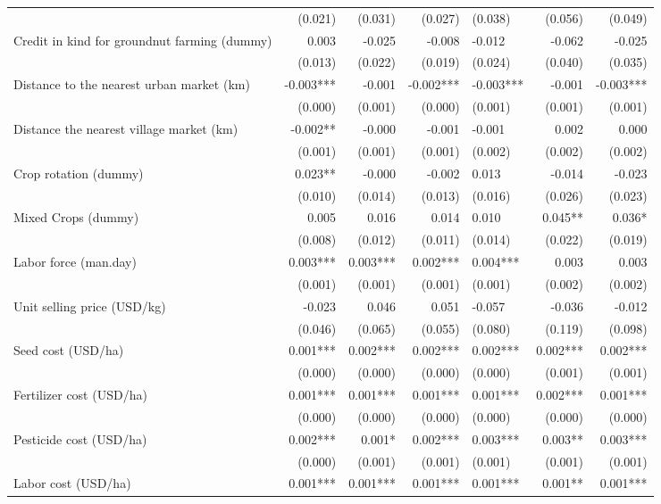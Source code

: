 \documentclass[
]{article}
\begin{document}
\begin{landscape}
\begin{longtable}[t]{lrrrlrr}
 & (0.021) & (0.031) & (0.027) & (0.038) & (0.056) & (0.049)\\
Credit in kind for groundnut farming (dummy) & 0.003 & -0.025 & -0.008 & -0.012 & -0.062 & -0.025\\
 & (0.013) & (0.022) & (0.019) & (0.024) & (0.040) & (0.035)\\
Distance to the nearest urban market (km) & -0.003*** & -0.001 & -0.002*** & -0.003*** & -0.001 & -0.003***\\
\addlinespace
 & (0.000) & (0.001) & (0.000) & (0.001) & (0.001) & (0.001)\\
Distance the nearest village market (km) & -0.002** & -0.000 & -0.001 & -0.001 & 0.002 & 0.000\\
 & (0.001) & (0.001) & (0.001) & (0.002) & (0.002) & (0.002)\\
Crop rotation (dummy) & 0.023** & -0.000 & -0.002 & 0.013 & -0.014 & -0.023\\
 & (0.010) & (0.014) & (0.013) & (0.016) & (0.026) & (0.023)\\
\addlinespace
Mixed Crops (dummy) & 0.005 & 0.016 & 0.014 & 0.010 & 0.045** & 0.036*\\
 & (0.008) & (0.012) & (0.011) & (0.014) & (0.022) & (0.019)\\
Labor force (man.day) & 0.003*** & 0.003*** & 0.002*** & 0.004*** & 0.003 & 0.003\\
 & (0.001) & (0.001) & (0.001) & (0.001) & (0.002) & (0.002)\\
Unit selling price (USD/kg) & -0.023 & 0.046 & 0.051 & -0.057 & -0.036 & -0.012\\
\addlinespace
 & (0.046) & (0.065) & (0.055) & (0.080) & (0.119) & (0.098)\\
Seed cost (USD/ha) & 0.001*** & 0.002*** & 0.002*** & 0.002*** & 0.002*** & 0.002***\\
 & (0.000) & (0.000) & (0.000) & (0.000) & (0.001) & (0.001)\\
Fertilizer cost (USD/ha) & 0.001*** & 0.001*** & 0.001*** & 0.001*** & 0.002*** & 0.001***\\
 & (0.000) & (0.000) & (0.000) & (0.000) & (0.000) & (0.000)\\
\addlinespace
Pesticide cost (USD/ha) & 0.002*** & 0.001* & 0.002*** & 0.003*** & 0.003** & 0.003***\\
 & (0.000) & (0.001) & (0.001) & (0.001) & (0.001) & (0.001)\\
Labor cost (USD/ha) & 0.001*** & 0.001*** & 0.001*** & 0.001*** & 0.001** & 0.001***\\

\end{longtable}
\end{landscape}
\end{document}
